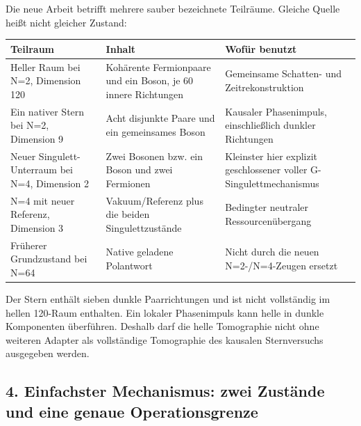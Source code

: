 Die neue Arbeit betrifft mehrere sauber bezeichnete Teilräume. Gleiche
Quelle heißt nicht gleicher Zustand:

{\def\LTcaptype{none} %
\begin{longtable}[]{@{}
  >{\raggedright\arraybackslash}p{}
  >{\raggedright\arraybackslash}p{}
  >{\raggedright\arraybackslash}p{}@{}}
\toprule\noalign{}
\begin{minipage}[b]{\linewidth}\raggedright
Teilraum
\end{minipage} & \begin{minipage}[b]{\linewidth}\raggedright
Inhalt
\end{minipage} & \begin{minipage}[b]{\linewidth}\raggedright
Wofür benutzt
\end{minipage} \\
\midrule\noalign{}
\endhead
\bottomrule\noalign{}
\endlastfoot
Heller Raum bei N=2, Dimension 120 & Kohärente Fermionpaare und ein
Boson, je 60 innere Richtungen & Gemeinsame Schatten- und
Zeitrekonstruktion \\
Ein nativer Stern bei N=2, Dimension 9 & Acht disjunkte Paare und ein
gemeinsames Boson & Kausaler Phasenimpuls, einschließlich dunkler
Richtungen \\
Neuer Singulett-Unterraum bei N=4, Dimension 2 & Zwei Bosonen bzw. ein
Boson und zwei Fermionen & Kleinster hier explizit geschlossener voller
G-Singulettmechanismus \\
N=4 mit neuer Referenz, Dimension 3 & Vakuum/Referenz plus die beiden
Singulettzustände & Bedingter neutraler Ressourcenübergang \\
Früherer Grundzustand bei N=64 & Native geladene Polantwort & Nicht
durch die neuen N=2-/N=4-Zeugen ersetzt \\
\end{longtable}
}

Der Stern enthält sieben dunkle Paarrichtungen und ist nicht vollständig
im hellen 120-Raum enthalten. Ein lokaler Phasenimpuls kann helle in
dunkle Komponenten überführen. Deshalb darf die helle Tomographie nicht
ohne weiteren Adapter als vollständige Tomographie des kausalen
Sternversuchs ausgegeben werden.

\subsection{4. Einfachster Mechanismus: zwei Zustände und eine genaue
Operationsgrenze}\label{einfachster-mechanismus-zwei-zustuxe4nde-und-eine-genaue-operationsgrenze}

